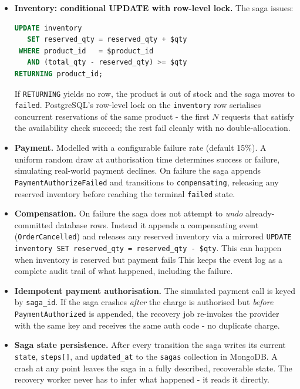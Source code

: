 \documentclass[11pt,a4paper]{article}
\newcommand{\code}[1]{\texttt{\small #1}}
\begin{document}
\begin{itemize}

  \item \textbf{Inventory: conditional UPDATE with row-level lock.}
  The saga issues:
  \begin{lstlisting}[language=SQL]
UPDATE inventory
   SET reserved_qty = reserved_qty + $qty
 WHERE product_id   = $product_id
   AND (total_qty - reserved_qty) >= $qty
RETURNING product_id;
  \end{lstlisting}
  If \code{RETURNING} yields no row, the product is out of stock and the saga
  moves to \code{failed}.
  PostgreSQL's row-level lock on the \code{inventory} row serialises concurrent
  reservations of the same product - the first $N$ requests that satisfy the
  availability check succeed; the rest fail cleanly with no double-allocation.

\item \textbf{Payment.} Modelled with a configurable failure rate (default 15\%). A
uniform random draw at authorisation time determines success or failure, simulating
real-world payment declines. On failure the saga appends \code{PaymentAuthorizeFailed}
and transitions to \code{compensating}, releasing any reserved inventory before
reaching the terminal \code{failed} state.

  \item \textbf{Compensation.}
  On failure the saga does not attempt to \emph{undo} already-committed database
  rows.
  Instead it appends a compensating event (\code{OrderCancelled}) and releases any
  reserved inventory via a mirrored \code{UPDATE inventory SET reserved\_qty =
  reserved\_qty - \$qty}. This can happen when inventory is reserved but payment fails
  This keeps the event log as a complete audit trail of what happened, including the
  failure.

  \item \textbf{Idempotent payment authorisation.}
  The simulated payment call is keyed by \code{saga\_id}.
  If the saga crashes \emph{after} the charge is authorised but \emph{before}
  \code{PaymentAuthorized} is appended, the recovery job re-invokes the provider
  with the same key and receives the same auth code - no duplicate charge.

  \item \textbf{Saga state persistence.}
  After every transition the saga writes its current \code{state},
  \code{steps[]}, and \code{updated\_at} to the \code{sagas} collection in MongoDB.
  A crash at any point leaves the saga in a fully described, recoverable state.
  The recovery worker never has to infer what happened - it reads it directly.


\end{itemize}
\end{document}
